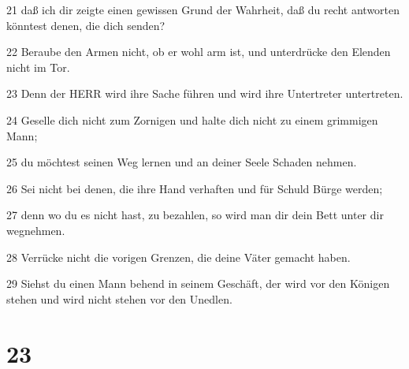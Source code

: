 \par 21 daß ich dir zeigte einen gewissen Grund der Wahrheit, daß du recht antworten könntest denen, die dich senden?
\par 22 Beraube den Armen nicht, ob er wohl arm ist, und unterdrücke den Elenden nicht im Tor.
\par 23 Denn der HERR wird ihre Sache führen und wird ihre Untertreter untertreten.
\par 24 Geselle dich nicht zum Zornigen und halte dich nicht zu einem grimmigen Mann;
\par 25 du möchtest seinen Weg lernen und an deiner Seele Schaden nehmen.
\par 26 Sei nicht bei denen, die ihre Hand verhaften und für Schuld Bürge werden;
\par 27 denn wo du es nicht hast, zu bezahlen, so wird man dir dein Bett unter dir wegnehmen.
\par 28 Verrücke nicht die vorigen Grenzen, die deine Väter gemacht haben.
\par 29 Siehst du einen Mann behend in seinem Geschäft, der wird vor den Königen stehen und wird nicht stehen vor den Unedlen.

\chapter{23}

